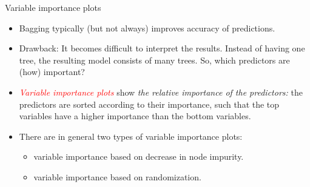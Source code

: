 \documentclass[10pt,ignorenonframetext,]{beamer}
\providecommand{\tightlist}{%
  \setlength{\itemsep}{0pt}\setlength{\parskip}{0pt}}
\begin{document}
\begin{frame}

\begin{block}{Variable importance plots}

\vspace{1mm}

\begin{itemize}
\item
  Bagging typically (but not always) improves accuracy of predictions.
\item
  Drawback: It becomes difficult to interpret the results. Instead of
  having one tree, the resulting model consists of many trees. So, which
  predictors are (how) important?
\end{itemize}

\begin{itemize}
\tightlist
\item
  \emph{\textcolor{red}{Variable importance plots}} show \emph{the
  relative importance of the predictors:} the predictors are sorted
  according to their importance, such that the top variables have a
  higher importance than the bottom variables.
\end{itemize}

\vspace{1mm}

\begin{itemize}
\item
  There are in general two types of variable importance plots:

  \begin{itemize}
  \tightlist
  \item
    variable importance based on decrease in node impurity.
  \item
    variable importance based on randomization.
  \end{itemize}
\end{itemize}

\end{block}

\end{frame}
\end{document}
